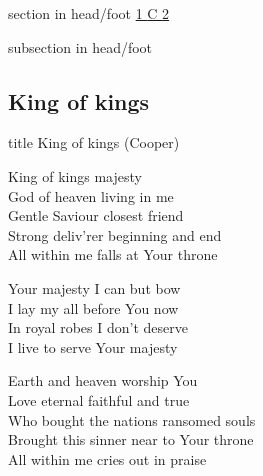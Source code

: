 \documentclass[aspectratio=169]{beamer}
\begin{document}
{
{ 
 {
 \begin{beamercolorbox}[ht=4.5ex,dp=1.5ex,%
      leftskip=.3cm,rightskip=.3cm plus1fil]{section in head/foot}
 \fontsize{12}{25}\selectfont 
\hyperlink{King of kings[](Cooper)1}{1  }\hyperlink{King of kings[](Cooper)C}{C  }\hyperlink{King of kings[](Cooper)2}{2  } 
 \end{beamercolorbox}%
  \begin{beamercolorbox}[ht=2.5ex,dp=1.125ex,%
   leftskip=.3cm,rightskip=.3cm plus1fil]{subsection in head/foot}
   \insertauthor
 \end{beamercolorbox}%
 }
}
\subsection{King of kings}
\hypertarget{King of kings[](Cooper)}{}
\begin{frame}{}
 \vfill
  \centering
  \begin{beamercolorbox}[sep=8pt,center,shadow=true,rounded=true]{title}
    King of kings (Cooper)    
  \end{beamercolorbox}
  \vfill
\end{frame}

\hypertarget{King of kings[](Cooper)1}{}
\begin{frame}{}
\fontsize{23.076923076923077}{27.69230769230769}\selectfont

King of kings majesty\\ 
God of heaven living in me\\ 
Gentle Saviour closest friend\\ 
Strong deliv'rer beginning and end\\ 
All within me falls at Your throne

\end{frame}
\hypertarget{King of kings[](Cooper)C}{}
\begin{frame}{}
\fontsize{23.076923076923077}{27.69230769230769}\selectfont

Your majesty I can but bow\\ 
I lay my all before You now\\ 
In royal robes I don't deserve\\ 
I live to serve Your majesty

\end{frame}
\hypertarget{King of kings[](Cooper)2}{}
\begin{frame}{}
\fontsize{23.076923076923077}{27.69230769230769}\selectfont

Earth and heaven worship You\\ 
Love eternal faithful and true\\ 
Who bought the nations ransomed souls\\ 
Brought this sinner near to Your throne\\ 
All within me cries out in praise

\end{frame}
}
\end{document}
